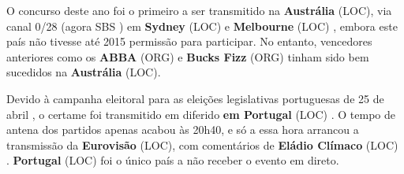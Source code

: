 \documentclass[12pt,a4paper]{article}
\begin{document}
O concurso deste ano foi o primeiro a ser transmitido na \textbf{Austrália} (LOC), via canal 0/28 (agora SBS ) em \textbf{Sydney} (LOC) e \textbf{Melbourne} (LOC) , embora este país não tivesse até 2015 permissão para participar. No entanto, vencedores anteriores como os \textbf{ABBA} (ORG) e \textbf{Bucks Fizz} (ORG) tinham sido bem sucedidos na \textbf{Austrália} (LOC).

Devido à campanha eleitoral para as eleições legislativas portuguesas de 25 de abril , o certame foi transmitido em diferido \textbf{em Portugal} (LOC) . O tempo de antena dos partidos apenas acabou às 20h40, e só a essa hora arrancou a transmissão da \textbf{Eurovisão} (LOC), com comentários de \textbf{Eládio Clímaco} (LOC) . \textbf{Portugal} (LOC) foi o único país a não receber o evento em direto.
\end{document}
